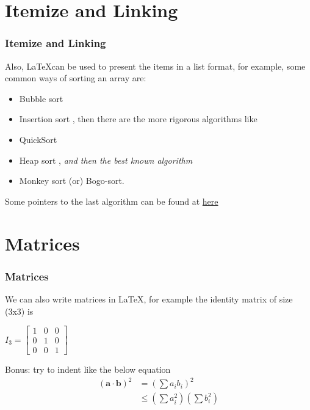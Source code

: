 \documentclass{beamer}
\begin{document}
\section[Itemize and Linking]{Itemize and Linking}
\begin{frame}
    \frametitle{Itemize and Linking}
    Also, \LaTeX can be used to present the items in a list format, for example,
    some common ways of sorting an array are:
    \begin{itemize}
        \item Bubble sort
        \item Insertion sort \pause, then there are the more rigorous algorithms like
        \item QuickSort
        \item Heap sort \pause, \textit{and then the best known algorithm}
        \item \alert{Monkey sort} (or) Bogo-sort.
    \end{itemize}
    Some pointers to the last algorithm can be found at \href{https://en.wikipedia.org/wiki/Bogosort}{here}
\end{frame}

\section[Matrices]{Matrices}
\begin{frame}
    \frametitle{Matrices}
    We can also write matrices in \LaTeX, for example the identity matrix of size
    (3x3) is\\
    \begin{center}
        \begin{math}
            I_3 = 
            \begin{bmatrix}
                1 & 0 & 0\\
                0 & 1 & 0\\
                0 & 0 & 1
            \end{bmatrix} 
        \end{math}
    \end{center}
    \pause
    \alert{Bonus: try to indent like the below equation}
    \begin{align*}
        \mathbf{(\textbf{a} \cdot \textbf{b})}^2 &= (\sum{a_ib_i})^2\\
        &\leq (\sum{a_i^2})(\sum{b_i^2})
    \end{align*}
\end{frame}
\end{document}
